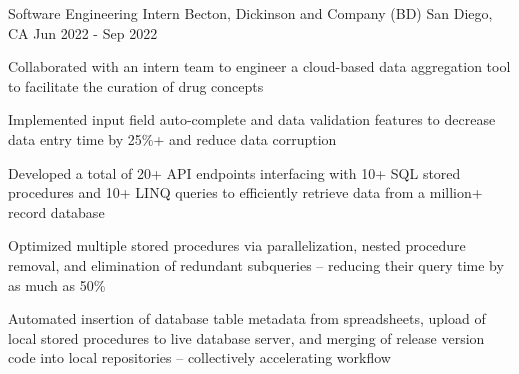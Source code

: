 

\begin{cventries}

  \cventry
    {Software Engineering Intern} %
    {Becton, Dickinson and Company (BD)} %
    {San Diego, CA} %
    {Jun 2022 - Sep 2022} %
    {\begin{cvitems} %
        \item {Collaborated with an intern team to engineer a cloud-based data aggregation tool to facilitate the curation of drug concepts} 
        \item { Implemented input field auto-complete and data validation features to decrease data entry time by 25\%+ and reduce data corruption }
        \item {Developed a total of 20+ API endpoints interfacing with 10+ SQL stored procedures and 10+ LINQ queries to efficiently retrieve data from a million+ record database}
        \item {Optimized multiple stored procedures via parallelization, nested procedure removal, and elimination of redundant subqueries -- reducing their query time by as much as 50\%}
        \item {Automated insertion of database table metadata from spreadsheets, upload of local stored procedures to live database server, and merging of release version code into local repositories -- collectively accelerating workflow}
      \end{cvitems}
    }
    

\end{cventries}
